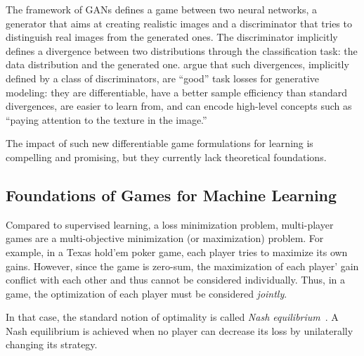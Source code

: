 
The framework of GANs defines a game between two neural networks, a generator that aims at creating realistic images and a discriminator that tries to distinguish real images from the generated ones. The discriminator implicitly defines a divergence between two distributions through the classification task: the data distribution and the generated one. \citet{huang2017parametric} argue that such divergences, implicitly defined by a class of discriminators, are ``good'' task losses for generative modeling: they are differentiable, have a better sample efficiency than standard divergences, are easier to learn from, and can encode high-level concepts such as ``paying attention to the texture in the image.''

 


The impact of such new differentiable game formulations for learning is compelling and promising, but they currently lack theoretical foundations.




\subsection{Foundations of Games for Machine Learning}







Compared to supervised learning, a loss minimization problem, multi-player games are a multi-objective minimization (or maximization) problem. For example, in a Texas hold’em poker game, each player tries to maximize its own gains. However, since the game is zero-sum, the maximization of each player' gain conflict with each other and thus cannot be considered individually. Thus, in a game, the optimization of each player must be considered \emph{jointly}.

In that case, the standard notion of optimality is called \emph{Nash equilibrium}~\citep{nash1950equilibrium}. A Nash equilibrium is achieved when no player can decrease its loss by unilaterally changing its strategy. 




